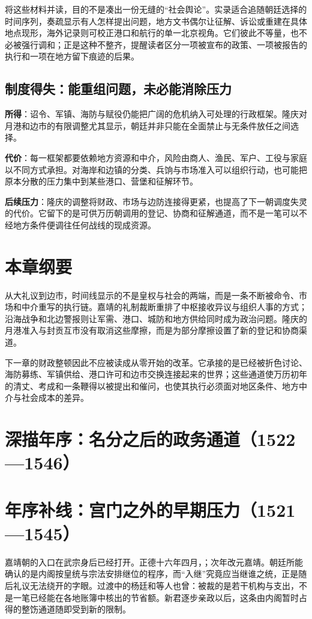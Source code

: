 将这些材料并读，目的不是凑出一份无缝的“社会舆论”。实录适合追随朝廷选择的时间序列，奏疏显示有人怎样提出问题，地方文书偶尔让征解、诉讼或重建在具体地点现形，海外记录则可校正港口和航行的单一北京视角。它们彼此不等量，也不必被强行调和；正是这种不整齐，提醒读者区分一项被宣布的政策、一项被报告的执行和一项在地方留下痕迹的后果。

\subsection{制度得失：能重组问题，未必能消除压力}
\textbf{所得}：诏令、军镇、海防与赋役仍能把广阔的危机纳入可处理的行政框架。隆庆对月港和边市的有限调整尤其显示，朝廷并非只能在全面禁止与无条件放任之间选择。

\textbf{代价}：每一框架都要依赖地方资源和中介，风险由商人、渔民、军户、工役与家庭以不同方式承担。对海岸和边镇的分类、兵饷与市场准入可以组织行动，也可能把原本分散的压力集中到某些港口、营堡和征解环节。

\textbf{后续压力}：隆庆的调整将财政、市场与边防连接得更紧，也提高了下一朝调度失灵的代价。它留下的是可供万历朝调用的登记、协商和征解通道，而不是一笔可以不经地方条件便调往任何战线的现成资源。

\section{本章纲要}

从大礼议到边市，时间线显示的不是皇权与社会的两端，而是一条不断被命令、市场和中介重写的执行链。嘉靖的礼制裁断重排了中枢接收异议与组织人事的方式；沿海战争和北边警报则让军需、港口、城防和地方供给同时成为政治问题。隆庆的月港准入与封贡互市没有取消这些摩擦，而是为部分摩擦设置了新的登记和协商渠道。

下一章的财政整顿因此不应被读成从零开始的改革。它承接的是已经被折色讨论、海防募练、军镇供给、港口许可和边市交换连接起来的世界；这些通道使万历初年的清丈、考成和一条鞭得以被提出和催问，也使其执行必须面对地区条件、地方中介与社会成本的差异。

\section{深描年序：名分之后的政务通道（1522—1546）}

\section{年序补线：宫门之外的早期压力（1521—1545）}

嘉靖朝的入口在武宗身后已经打开。正德十六年四月，；次年改元嘉靖。朝廷所能确认的是内阁按皇统与宗法安排继位的程序，而“入继”究竟应当继谁之统，正是随后礼议无法绕开的字眼。过渡中的杨廷和等人也曾：被裁的是若干机构与支出，不是一笔已经能在各地账簿中核出的节省额。新君逐步亲政以后，这条由内阁暂时占得的整饬通道随即受到新的限制。

